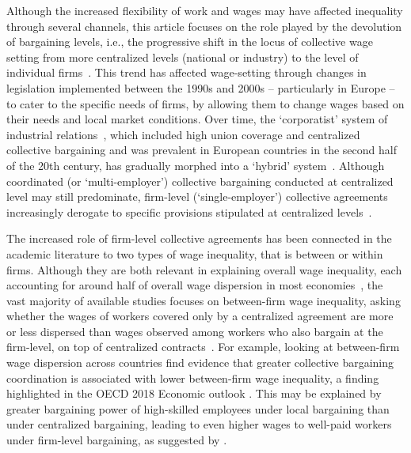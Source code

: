 \documentclass[12pt]{article}
\begin{document}
Although the increased flexibility of work and wages may have affected inequality through several channels, this article focuses on the role played by the devolution of bargaining levels, i.e., the progressive shift in the locus of collective wage setting from more centralized levels (national or industry) to the level of individual firms~\citep{undy1978}. This trend has affected wage-setting through changes in legislation implemented between the 1990s and 2000s -- particularly in Europe -- to cater to the specific needs of firms, by allowing them to change wages based on their needs and local market conditions.
Over time, the ‘corporatist’ system of industrial relations~\citep{wallerstein1997unions}, which included high union coverage and centralized collective bargaining and was prevalent in European countries in the second half of the 20th century, has gradually morphed into a ‘hybrid’ system~\citep{Braakmann}. 
Although coordinated (or ‘multi-employer’) collective bargaining conducted at centralized level may still predominate, firm-level (‘single-employer’)  collective agreements increasingly derogate to specific provisions stipulated at centralized levels~\citep{visser2013wage}.

The increased role of firm-level collective agreements has been connected in the academic literature to two types of wage inequality, that is between or within firms.
Although they are both relevant in explaining overall wage inequality, each accounting for around half of overall wage dispersion in most economies~\citep{lazear.shaw.2007,fournier.koske.2013,GlobalWageReport}, the vast majority of available studies focuses on between-firm wage inequality, asking whether the wages of workers covered only by a centralized agreement are more or less dispersed than wages observed among workers who also bargain at the firm-level, on top of centralized contracts~\citep[see][among others]{dellaringa.lucifora.1994, card.delarica.2006, dellaringa.pagani.2007,daouli.demoussis.ea.2013}.
For example, looking at between-firm wage dispersion across countries \citet{Berlingieri2017} find evidence that greater collective bargaining coordination is associated with lower between-firm wage inequality, a finding highlighted in the OECD 2018 Economic outlook \citep{OECD2018}. This may be explained by greater bargaining power of high-skilled employees under local bargaining than under centralized bargaining, leading to even higher wages to well-paid workers under firm-level bargaining, as suggested by \cite{dahl.lemaire.ea.2013}.
\end{document}
